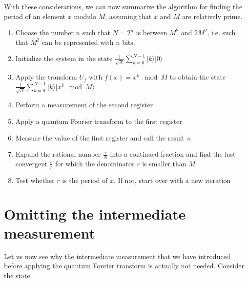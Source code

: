 \documentclass[a4paper, draft]{article}
\theoremstyle{own}
\theoremstyle{remark}
\begin{document}
With these considerations, we can now summarize the algorithm for finding the period of an element $x$ modulo $M$, assuming that $x$ and $M$ are relatively prime.

\begin{enumerate}
	\item Choose the number $n$ such that $N=2^n$ is between $M^2$ and $2M^2$, i.e. such that $M^2$ can be represented with $n$ bits.
	\item Initialize the system in the state $\frac{1}{\sqrt{N}} \sum_{k=0}^{N-1} |k \rangle  |0\rangle$
	\item Apply the transform $U_f$ with $f(x) = x^k \mod M$ to obtain the state
	$\frac{1}{\sqrt{N}} \sum_{k=0}^{N-1} |k \rangle  |x^k \mod M \rangle$
	\item Perform a measurement of the second register
	\item Apply a quantum Fourier transform to the first register
	\item Measure the value of the first register and call the result $s$.
	\item Expand the rational number $\frac{r}{N}$ into a continued fraction and find the last convergent $\frac{c}{r}$ for which the denominator $r$ is smaller than $M$
	\item Test whether $r$ is the period of $x$. If not, start over with a new iteration 
\end{enumerate}


\section{Omitting the intermediate measurement}

Let us now see why the intermediate measurement that we have introduced before applying the quantum Fourier transform is actually not needed. Consider the state
\end{document}
